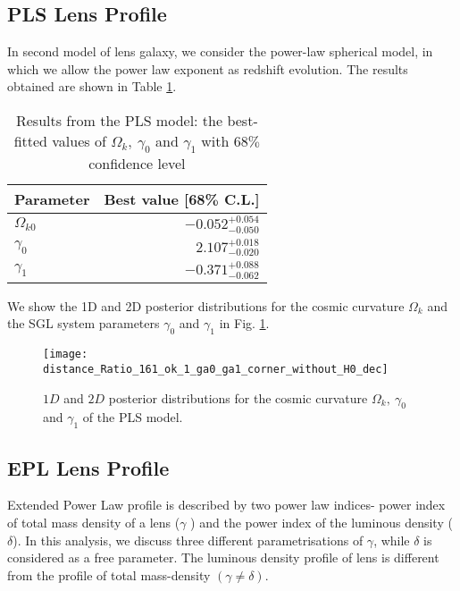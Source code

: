\documentclass[12pt]{report}
\begin{document}
\subsection{PLS Lens Profile}
In second model of lens galaxy, we consider the power-law spherical model, in which we allow the power law exponent as redshift evolution. The results obtained are shown in Table \ref{tb:sl2}. 
\begin{table}[h!]
\centering
\begin{large}
    \begin{tabular}[b]{| l | r |}\hline
       Parameter & Best value [68\% C.L.] \\ \hline \hline
    $\Omega_{k0}$ & $-0.052^{+0.054}_{-0.050} $ \\ \hline
   $\gamma_0$ & $2.107^{+0.018}_{-0.020}$ \\ \hline
   $\gamma_1$ & $-0.371^{+0.088}_{-0.062}$ \\ \hline
    \end{tabular}
\end{large}
\caption{Results from the PLS model: the best-fitted values of $\Omega_k,~\gamma_0$ and $\gamma_1$ with $68\%$ confidence level }
\label{tb:sl2}
\end{table}
We show the 1D and 2D posterior distributions for the cosmic curvature $\Omega_k$ and the SGL system parameters $\gamma_0$ and $\gamma_1$ in Fig. \ref{fig:sl3}.
\begin{figure}[H]
    \centering
    \texttt{[image: distance\_Ratio\_161\_ok\_1\_ga0\_ga1\_corner\_without\_H0\_dec]}
    \caption{$1D$ and $2D$ posterior distributions for the cosmic curvature $\Omega_k,~ \gamma_0$ and $\gamma_1$ of the PLS model.}
    \label{fig:sl3}
\end{figure}
\subsection{EPL Lens Profile}
Extended Power Law profile  is described by two power law indices- power index of total mass density of a lens ($\gamma$ ) and the power index of the luminous density ($\delta$). In this analysis, we discuss three different parametrisations of $\gamma$, while $\delta$ is considered as a free parameter. The luminous density profile of lens is different from the profile of total mass-density $(\gamma\neq\delta)$. 
\end{document}
